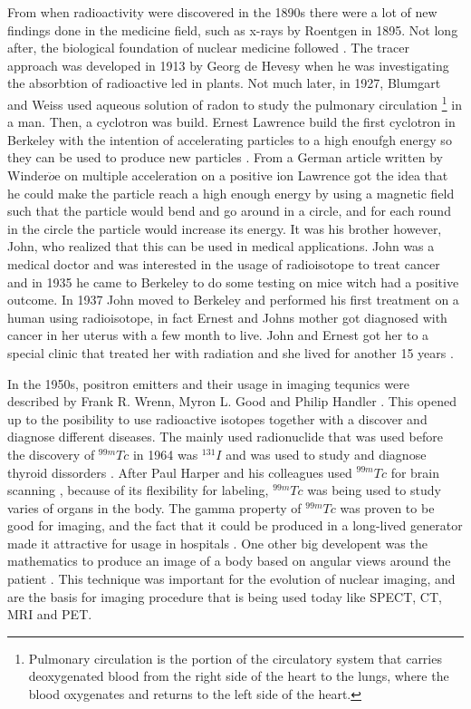 \documentclass[twoside,english]{uiofysmaster/uiofysmaster}
\begin{document}
From when radioactivity were discovered in the 1890s there were a lot of new findings done in the medicine field, such as x-rays by Roentgen in 1895. Not long after, the biological foundation of nuclear medicine followed \cite{Cherry2012_chap1}. The tracer approach was developed in 1913 by Georg de Hevesy \cite{Hevesy2014} when he was investigating the absorbtion of radioactive led in plants. Not much later, in 1927, Blumgart and Weiss \cite{Blumgart1927} used aqueous solution of radon to study the pulmonary circulation \footnote{Pulmonary circulation is the portion of the circulatory system that carries deoxygenated blood from the right side of the heart to the lungs, where the blood oxygenates and returns to the left side of the heart.} in a man. Then, a cyclotron was build. Ernest Lawrence build the first cyclotron in Berkeley with the intention of accelerating particles to a high enouƒgh energy so they can be used to produce new particles \cite{E.Lawrence}. From a German article written by Winder$\ddot{o}$e on multiple acceleration on a positive ion Lawrence got the idea that he could make the particle reach a high enough energy by using a magnetic field such that the particle would bend and go around in a circle, and for each round in the circle the particle would increase its energy. It was his brother however, John, who realized that this can be used in medical applications. John was a medical doctor and was interested in the usage of radioisotope to treat cancer and in 1935 he came to Berkeley to do some testing on mice witch had a positive outcome. In 1937 John moved to Berkeley and performed his first treatment on a human using radioisotope, in fact Ernest and Johns mother got diagnosed with cancer in her uterus with a few month to live. John and Ernest got her to a special clinic that treated her with radiation and she lived for another 15 years \cite{E.Lawrence}. 


In the 1950s,  positron emitters and their usage in imaging tequnics were described by Frank R. Wrenn, Myron L. Good and Philip Handler \cite{Wrenn1951}. This opened up to the posibility to use radioactive isotopes together with a discover and diagnose different diseases. The mainly used radionuclide that was used before the discovery of $^{99m}Tc$ in 1964 \cite{harper_tc99m} was $^{131}I$ and was used to study and diagnose thyroid dissorders \cite{Cherry2012_chap1}. After Paul Harper and his colleagues used $^{99m}Tc$ for brain scanning \cite{harper_tc99m},  because of its flexibility for labeling, $^{99m}Tc$ was being used to study varies of organs in the body. The gamma property of $^{99m}Tc$ was proven to be good for imaging, and the fact that it could be produced in a long-lived generator made it attractive for usage in hospitals \cite{harper_tc99m}. One other big developent was the mathematics to produce an image of a body based on angular views around the patient \cite{Cherry2012_chap1}. This technique was important for the evolution of nuclear imaging, and are the basis for imaging procedure that is being used today like SPECT, CT, MRI and PET.
\end{document}

